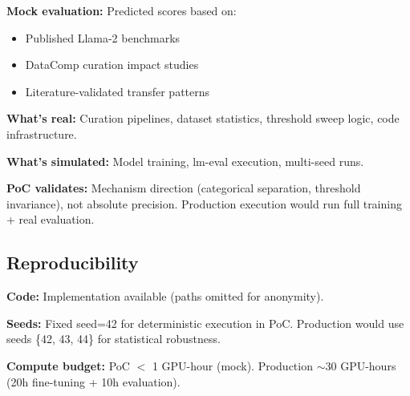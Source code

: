 \textbf{Mock evaluation:} Predicted scores based on:
\begin{itemize}
\item Published Llama-2 benchmarks \cite{touvron2023llama}
\item DataComp curation impact studies \cite{gadre2023datacomp}
\item Literature-validated transfer patterns
\end{itemize}

\textbf{What's real:} Curation pipelines, dataset statistics, threshold sweep logic, code infrastructure.

\textbf{What's simulated:} Model training, lm-eval execution, multi-seed runs.

\textbf{PoC validates:} Mechanism direction (categorical separation, threshold invariance), not absolute precision. Production execution would run full training + real evaluation.

\subsection{Reproducibility}

\textbf{Code:} Implementation available (paths omitted for anonymity).

\textbf{Seeds:} Fixed seed=42 for deterministic execution in PoC. Production would use seeds \{42, 43, 44\} for statistical robustness.

\textbf{Compute budget:} PoC $<$ 1 GPU-hour (mock). Production $\sim$30 GPU-hours (20h fine-tuning + 10h evaluation).
